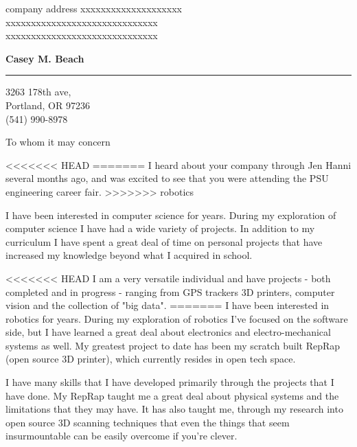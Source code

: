 \documentclass{letter} %
\begin{document}
\signature{Casey M. Beach}           %
\longindentation=0pt                       %
\let\raggedleft\raggedright                %
 
 
\begin{letter}{company address xxxxxxxxxxxxxxxxxxxx \\
xxxxxxxxxxxxxxxxxxxxxxxxxxxxxx \\
xxxxxxxxxxxxxxxxxxxxxxxxxxxxxx }

\begin{center}
{\large\bf Casey M. Beach}
\end{center}
\medskip\hrule height 1pt
\begin{center}
 3263 178th ave,\\
Portland, OR 97236 \\
(541) 990-8978 
\end{center} 
\vfill %

 
\opening{To whom it may concern} 
\begin{flushleft} 
<<<<<<< HEAD
=======
\noindent I heard about your company through Jen Hanni several months ago, and was excited to see that you were attending the 
PSU engineering career fair.
>>>>>>> robotics

\noindent I have been interested in computer science for years.  During my exploration of computer science
I have had a wide variety of projects.  In addition to my curriculum I have spent a great deal of time
on personal projects that have increased my knowledge beyond what I acquired in school.

<<<<<<< HEAD
I am a very versatile individual and have projects - both completed and in progress - ranging from GPS trackers
3D printers, computer vision and the collection of "big data".
=======
\noindent I have been interested in robotics for years.  During my exploration of robotics I've focused on 
the software side, but I have learned a great deal about electronics and electro-mechanical systems as well.  
My greatest project to date has been my scratch built RepRap (open source 3D printer), which currently resides in open 
tech space.

\noindent I have many skills that I have developed primarily through the projects that I have done.  My RepRap taught me
a great deal about physical systems and the limitations that they may have.  It has also taught me, through my research into
open source 3D scanning techniques that even the things that seem insurmountable can be easily overcome if you're clever.


\end{flushleft}
\end{letter}
\end{document}
